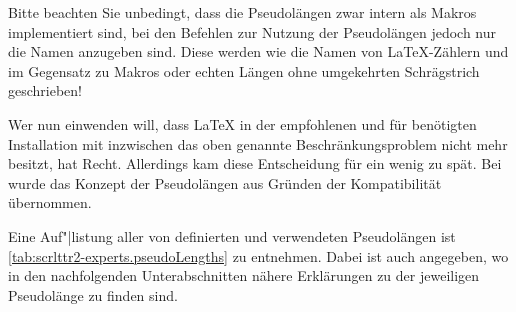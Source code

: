 Bitte beachten Sie unbedingt, dass die Pseudolängen zwar
intern als Makros implementiert sind, bei den Befehlen zur Nutzung der
Pseudolängen jedoch nur die Namen anzugeben sind. Diese werden wie die Namen
von \LaTeX-Zählern und im Gegensatz zu Makros oder echten Längen ohne
umgekehrten Schrägstrich geschrieben!

Wer nun einwenden will, dass \LaTeX{} in der empfohlenen und für \KOMAScript{}
benötigten Installation mit \eTeX{} inzwischen das oben genannte
Beschränkungsproblem nicht mehr besitzt, hat Recht. Allerdings kam diese
Entscheidung für  ein wenig zu spät. Bei 
wurde das Konzept der Pseudolängen aus Gründen der Kompatibilität übernommen.

Eine Auf"|listung aller von \KOMAScript{} definierten und verwendeten
Pseudolängen ist \autoref{tab:scrlttr2-experts.pseudoLengths} zu
entnehmen. Dabei ist auch angegeben, wo in den nachfolgenden Unterabschnitten
nähere Erklärungen zu der jeweiligen Pseudolänge zu finden
sind.%

